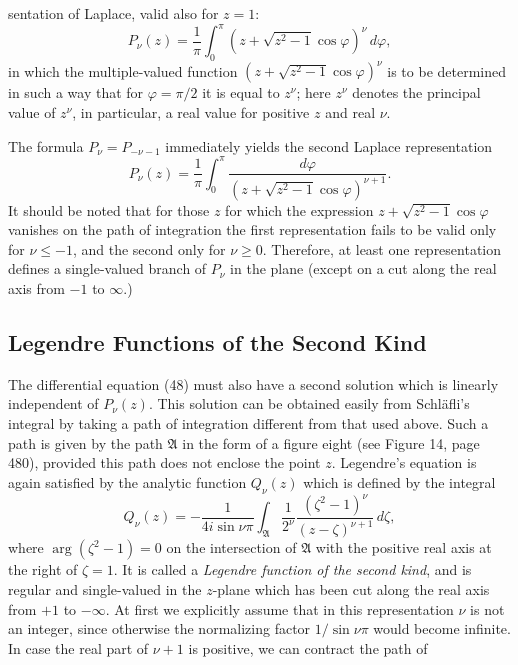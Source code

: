 sentation of Laplace, valid also for $z=1$:
\begin{equation}\tag{50}
P_\nu(z)=\frac1\pi\int_0^\pi\left(z+\sqrt{z^2-1}\cos\varphi\right)^\nu\,d\varphi,
\end{equation}
in which the multiple-valued function $(z+\sqrt{z^2-1}\cos\varphi)^\nu$ is to be determined in such a way that for $\varphi=\pi/2$ it is equal to $z^\nu$; here $z^\nu$ denotes the principal value of $z^\nu$, in particular, a real value for positive $z$ and real $\nu$.

The formula $P_\nu=P_{-\nu-1}$ immediately yields the second Laplace representation
\begin{equation}\tag{51}
P_\nu(z)=\frac1\pi\int_0^\pi\frac{d\varphi}{\left(z+\sqrt{z^2-1}\cos\varphi\right)^{\nu+1}}.
\end{equation}
It should be noted that for those $z$ for which the expression $z+\sqrt{z^2-1}\cos\varphi$ vanishes on the path of integration the first representation fails to be valid only for $\nu\le-1$, and the second only for $\nu\ge0$. Therefore, at least one representation defines a single-valued branch of $P_\nu$ in the plane (except on a cut along the real axis from $-1$ to $\infty$.)

\subsection{Legendre Functions of the Second Kind}
The differential equation (48) must also have a second solution which is linearly independent of $P_\nu(z)$. This solution can be obtained easily from Schl\"afli's integral by taking a path of integration different from that used above. Such a path is given by the path $\mathfrak A$ in the form of a figure eight (see Figure 14, page 480), provided this path does not enclose the point $z$. Legendre's equation is again satisfied by the analytic function $Q_\nu(z)$ which is defined by the integral
\begin{equation}\tag{52}
Q_\nu(z)=-\frac1{4i\sin\nu\pi}\int_{\mathfrak A}
\frac1{2^\nu}\frac{(\zeta^2-1)^\nu}{(z-\zeta)^{\nu+1}}\,d\zeta,
\end{equation}
where $\arg(\zeta^2-1)=0$ on the intersection of $\mathfrak A$ with the positive real axis at the right of $\zeta=1$. It is called a \emph{Legendre function of the second kind}, and is regular and single-valued in the $z$-plane which has been cut along the real axis from $+1$ to $-\infty$. At first we explicitly assume that in this representation $\nu$ is not an integer, since otherwise the normalizing factor $1/\sin\nu\pi$ would become infinite. In case the real part of $\nu+1$ is positive, we can contract the path of

